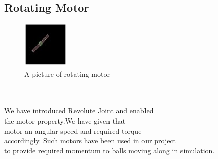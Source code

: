\subsection{Rotating Motor}
\begin{figure}
	\caption{A picture of rotating motor}
	\centering
	 \includegraphics[width=0.2\textwidth]{./doc/motor.jpg}%
\end{figure}
\begin{frame}
\centering
\\
\\
We have introduced Revolute Joint and enabled \\the motor property.We have given that\\ motor an angular speed and required torque\\ accordingly. Such motors have been used in our project \\to provide required momentum to balls moving along in simulation.
\end{frame}
\\
\\
